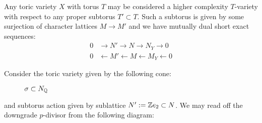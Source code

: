 Any toric variety \(X\) with torus \(T\) may be considered a higher complexity \(T\)-variety with respect to any proper subtorus \(T' \subset T\). Such a subtorus is given by some surjection of character lattices \(M \to M'\) and we have mutually dual short exact sequences:
\begin{align*}
0 &\rightarrow N' \rightarrow N \rightarrow N_Y \rightarrow 0 \\
0 &\leftarrow M' \leftarrow M \leftarrow M_Y \leftarrow 0
\end{align*}
\begin{example}
Consider the toric variety given by the following cone:
\begin{figure}[H] \label{fig:toricfan}
\centering
	\caption{$\sigma \subset N_{\mathbb{Q}}$}
\end{figure}
and subtorus action given by sublattice \(N' := \mathbb{Z} e_2 \subset N\). We may read off the downgrade \(p\)-divisor from the following diagram:
\begin{figure}[H]
\centering


\end{figure}
\end{example}

